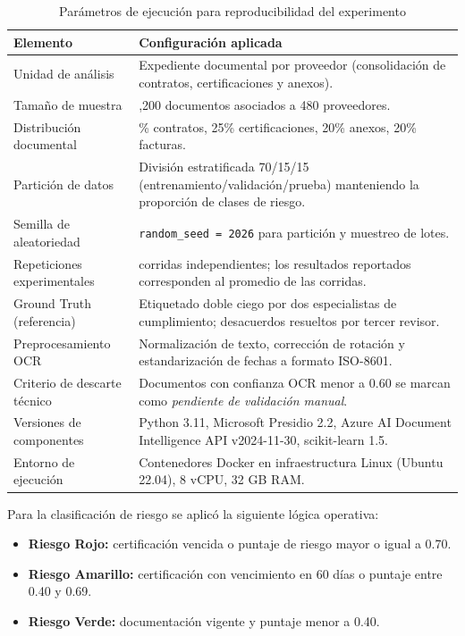 \documentclass[12pt]{article}
\begin{document}
\begin{table}[htbp]
\centering
\caption{Parámetros de ejecución para reproducibilidad del experimento}
\vspace{0.3cm}
\label{tab:protocolo-reproducibilidad}
\begin{tabularx}{\textwidth}{|>{\raggedright\arraybackslash}X|>{\raggedright\arraybackslash}X|}
\hline
\textbf{Elemento} & \textbf{Configuración aplicada} \\
\hline
Unidad de análisis & Expediente documental por proveedor (consolidación de contratos, certificaciones y anexos). \\
\hline
Tamaño de muestra & 1,200 documentos asociados a 480 proveedores. \\
\hline
Distribución documental & 35\% contratos, 25\% certificaciones, 20\% anexos, 20\% facturas. \\
\hline
Partición de datos & División estratificada 70/15/15 (entrenamiento/validación/prueba) manteniendo la proporción de clases de riesgo. \\
\hline
Semilla de aleatoriedad & \texttt{random\_seed = 2026} para partición y muestreo de lotes. \\
\hline
Repeticiones experimentales & 5 corridas independientes; los resultados reportados corresponden al promedio de las corridas. \\
\hline
Ground Truth (referencia) & Etiquetado doble ciego por dos especialistas de cumplimiento; desacuerdos resueltos por tercer revisor. \\
\hline
Preprocesamiento OCR & Normalización de texto, corrección de rotación y estandarización de fechas a formato ISO-8601. \\
\hline
Criterio de descarte técnico & Documentos con confianza OCR menor a 0.60 se marcan como \textit{pendiente de validación manual}. \\
\hline
Versiones de componentes & Python 3.11, Microsoft Presidio 2.2, Azure AI Document Intelligence API v2024-11-30, scikit-learn 1.5. \\
\hline
Entorno de ejecución & Contenedores Docker en infraestructura Linux (Ubuntu 22.04), 8 vCPU, 32 GB RAM. \\
\hline
\end{tabularx}
\end{table}

Para la clasificación de riesgo se aplicó la siguiente lógica operativa:

\begin{itemize}
    \item \textbf{Riesgo Rojo:} certificación vencida o puntaje de riesgo mayor o igual a 0.70.
    \item \textbf{Riesgo Amarillo:} certificación con vencimiento en 60 días o puntaje entre 0.40 y 0.69.
    \item \textbf{Riesgo Verde:} documentación vigente y puntaje menor a 0.40.
\end{itemize}
\end{document}
